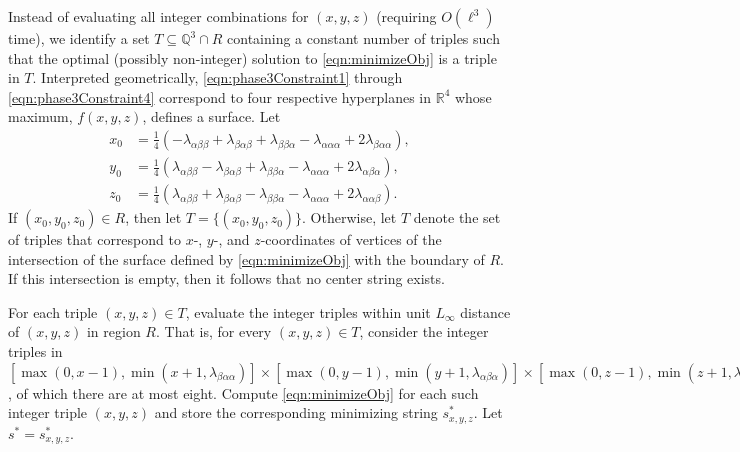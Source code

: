 Instead of evaluating all integer combinations for $(x,y,z)$
(requiring $O(\ell^3)$ time),
we identify a set $T \subseteq \mathbb{Q}^3 \cap R$ 
containing a constant number of triples
such that the optimal (possibly non-integer)
solution to \eqref{eqn:minimizeObj} is a triple in $T$.
Interpreted geometrically, 
\eqref{eqn:phase3Constraint1} through \eqref{eqn:phase3Constraint4}
correspond to four respective hyperplanes in $\mathbb{R}^4$
whose maximum, $f(x,y,z)$, defines a surface.
Let
\begin{align}
x_0 & = \frac{1}{4} \left(
- \lambda_{\alpha\beta\beta} + \lambda_{\beta\alpha\beta}
+ \lambda_{\beta\beta\alpha} - \lambda_{\alpha\alpha\alpha}
+ 2\lambda_{\beta\alpha\alpha} \right) ,
\nonumber \\
y_0 & = \frac{1}{4} \left(
  \lambda_{\alpha\beta\beta} - \lambda_{\beta\alpha\beta}
+ \lambda_{\beta\beta\alpha} - \lambda_{\alpha\alpha\alpha}
+ 2\lambda_{\alpha\beta\alpha} \right) ,
\nonumber \\
z_0 & = \frac{1}{4} \left(
  \lambda_{\alpha\beta\beta} + \lambda_{\beta\alpha\beta}
- \lambda_{\beta\beta\alpha} - \lambda_{\alpha\alpha\alpha}
+ 2\lambda_{\alpha\alpha\beta} \right) .
\label{eqn:phase3Sol}
\end{align}
If $(x_0,y_0,z_0) \in R$, then let $T = \{(x_0, y_0, z_0)\}$.
Otherwise, let $T$ denote the set of triples that correspond to
$x$-, $y$-, and $z$-coordinates of vertices of the
intersection of the surface defined by 
\eqref{eqn:minimizeObj} with the boundary of $R$.
If this intersection is empty, then it follows that no center string exists.

For each triple $(x,y,z) \in T$, 
evaluate the integer triples within unit $L_\infty$ distance 
of $(x,y,z)$ in region $R$. 
That is, for every $(x,y,z) \in T$, consider the integer triples in 
$[ \max(0, x-1), \min(x+1, \lambda_{\beta\alpha\alpha}) ]
\times [ \max(0, y-1), \min(y+1, \lambda_{\alpha\beta\alpha}) ]
\times [ \max(0, z-1), \min(z+1, \lambda_{\alpha\alpha\beta}) ]$,
of which there are at most eight.
Compute \eqref{eqn:minimizeObj}
for each such integer triple $(x,y,z)$
and store the corresponding minimizing string $s^*_{x,y,z}$.
Let $s^* = s^*_{x,y,z}$.

